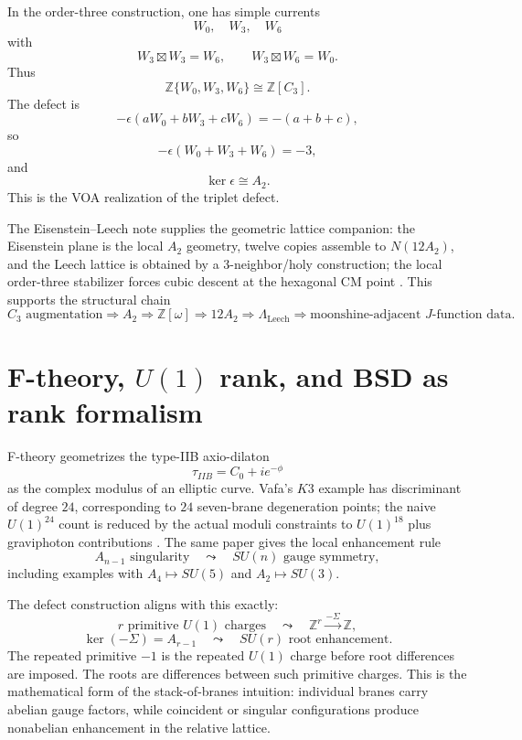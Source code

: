 \documentclass[11pt]{article}
\theoremstyle{remark}
\newcommand{\ZZ}{\mathbb Z}
\begin{document}
In the order-three construction, one has simple currents
\[
        W_0,
        \quad W_3,
        \quad W_6
\]
with
\[
        W_3\boxtimes W_3=W_6,
        \qquad
        W_3\boxtimes W_6=W_0.
\]
Thus
\[
        \ZZ\{W_0,W_3,W_6\}\cong\ZZ[C_3].
\]
The defect is
\[
        -\epsilon(aW_0+bW_3+cW_6)=-(a+b+c),
\]
so
\[
        -\epsilon(W_0+W_3+W_6)=-3,
\]
and
\[
        \ker\epsilon\cong A_2.
\]
This is the VOA realization of the triplet defect.

The Eisenstein--Leech note supplies the geometric lattice companion: the Eisenstein plane is the local $A_2$ geometry, twelve copies assemble to $N(12A_2)$, and the Leech lattice is obtained by a 3-neighbor/holy construction; the local order-three stabilizer forces cubic descent at the hexagonal CM point \cite{EisensteinLeechNote}.  This supports the structural chain
\[
        C_3\text{ augmentation}
        \Rightarrow A_2
        \Rightarrow \ZZ[\omega]
        \Rightarrow 12A_2
        \Rightarrow \Lambda_{\mathrm{Leech}}
        \Rightarrow \text{moonshine-adjacent }J\text{-function data}.
\]

\section{F-theory, $U(1)$ rank, and BSD as rank formalism}

F-theory geometrizes the type-IIB axio-dilaton
\[
        \tau_{IIB}=C_0+ie^{-\phi}
\]
as the complex modulus of an elliptic curve.  Vafa's $K3$ example has discriminant of degree $24$, corresponding to $24$ seven-brane degeneration points; the naive $U(1)^{24}$ count is reduced by the actual moduli constraints to $U(1)^{18}$ plus graviphoton contributions \cite{VafaFTheory}.  The same paper gives the local enhancement rule
\[
        A_{n-1}\text{ singularity}\quad\leadsto\quad SU(n)\text{ gauge symmetry},
\]
including examples with $A_4\mapsto SU(5)$ and $A_2\mapsto SU(3)$.

The defect construction aligns with this exactly:
\[
        r\text{ primitive }U(1)\text{ charges}
        \quad\leadsto\quad
        \ZZ^r\xrightarrow{-\Sigma}\ZZ,
\]
\[
        \ker(-\Sigma)=A_{r-1}
        \quad\leadsto\quad
        SU(r)\text{ root enhancement}.
\]
The repeated primitive $-1$ is the repeated $U(1)$ charge before root differences are imposed.  The roots are differences between such primitive charges.  This is the mathematical form of the stack-of-branes intuition: individual branes carry abelian gauge factors, while coincident or singular configurations produce nonabelian enhancement in the relative lattice.
\end{document}
